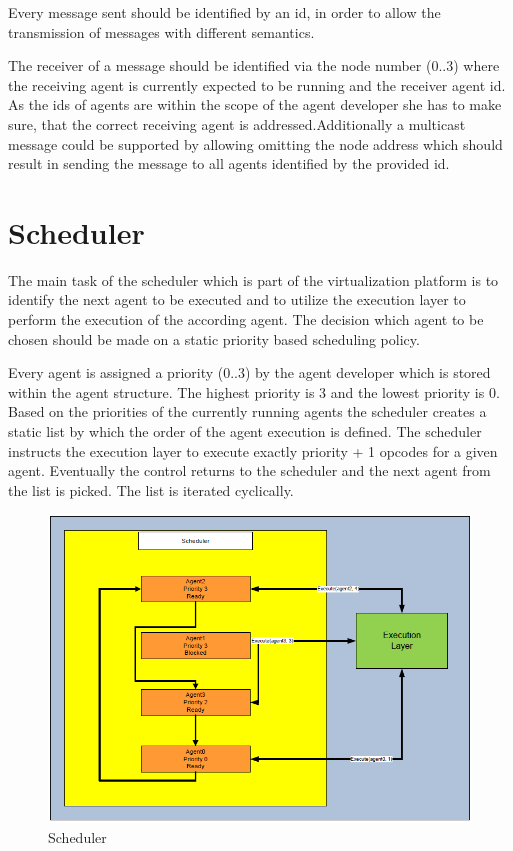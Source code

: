\documentclass{scrreprt}
\begin{document}
\noindent
Every message sent should be identified by an id, in order to allow the transmission of messages with different semantics.

The receiver of a message should be identified via the node number (0..3) where the receiving agent is currently expected
 to be running and the receiver agent id. As the ids of agents are within the scope of the agent developer she has to make 
sure, that the correct receiving agent is addressed.Additionally a multicast message could be supported by allowing omitting 
the node address which should result in sending the message to all agents identified by the provided id. 

\section{Scheduler}
The main task of the scheduler which is part of the virtualization platform is to identify the next agent to be executed 
and to utilize the execution layer to perform the execution of the according agent. The decision which agent to be chosen 
should be made on a static priority based scheduling policy.


\noindent
Every agent is assigned a priority (0..3) by the agent developer which is stored within the agent structure. 
The highest priority is 3 and the lowest priority is 0. Based on the priorities of the currently running agents 
the scheduler creates a static list by which the order of the agent execution is defined. The scheduler instructs 
the execution layer to execute exactly priority + 1 opcodes for a given agent. Eventually the control returns to 
the scheduler and the next agent from the list is picked. The list is iterated cyclically.

\begin{figure}[!htbp]
\begin{center}
\includegraphics[scale=0.4]{figures/scheduler.png}
\caption{Scheduler}
\end{center}
\label{scheduler}
\end{figure}
\end{document}
